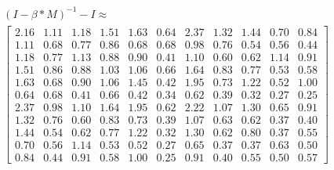 \begin{gather}
	\nonumber (I - \beta * M)^{-1} - I \approx\\
	 \begin{bmatrix}
		2.16 & 1.11 & 1.18 & 1.51 & 1.63 & 0.64 & 2.37 & 1.32 & 1.44 & 0.70 & 0.84\\
		1.11 & 0.68 & 0.77 & 0.86 & 0.68 & 0.68 & 0.98 & 0.76 & 0.54 & 0.56 & 0.44\\
		1.18 & 0.77 & 1.13 & 0.88 & 0.90 & 0.41 & 1.10 & 0.60 & 0.62 & 1.14 & 0.91\\
		1.51 & 0.86 & 0.88 & 1.03 & 1.06 & 0.66 & 1.64 & 0.83 & 0.77 & 0.53 & 0.58\\
		1.63 & 0.68 & 0.90 & 1.06 & 1.45 & 0.42 & 1.95 & 0.73 & 1.22 & 0.52 & 1.00\\
		0.64 & 0.68 & 0.41 & 0.66 & 0.42 & 0.34 & 0.62 & 0.39 & 0.32 & 0.27 & 0.25\\
		2.37 & 0.98 & 1.10 & 1.64 & 1.95 & 0.62 & 2.22 & 1.07 & 1.30 & 0.65 & 0.91\\
		1.32 & 0.76 & 0.60 & 0.83 & 0.73 & 0.39 & 1.07 & 0.63 & 0.62 & 0.37 & 0.40\\
		1.44 & 0.54 & 0.62 & 0.77 & 1.22 & 0.32 & 1.30 & 0.62 & 0.80 & 0.37 & 0.55\\
		0.70 & 0.56 & 1.14 & 0.53 & 0.52 & 0.27 & 0.65 & 0.37 & 0.37 & 0.63 & 0.50\\
		0.84 & 0.44 & 0.91 & 0.58 & 1.00 & 0.25 & 0.91 & 0.40 & 0.55 & 0.50 & 0.57
	\end{bmatrix}
	\label{frml:katzZentralitaetPseudoMitarbeiter:formel5}
\end{gather}